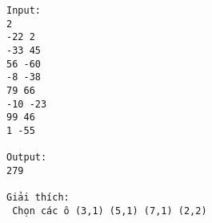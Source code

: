 \begin{verbatim}
Input:
2
-22 2
-33 45
56 -60
-8 -38
79 66
-10 -23
99 46
1 -55

Output:
279

Giải thích:
 Chọn các ô (3,1) (5,1) (7,1) (2,2)

\end{verbatim}